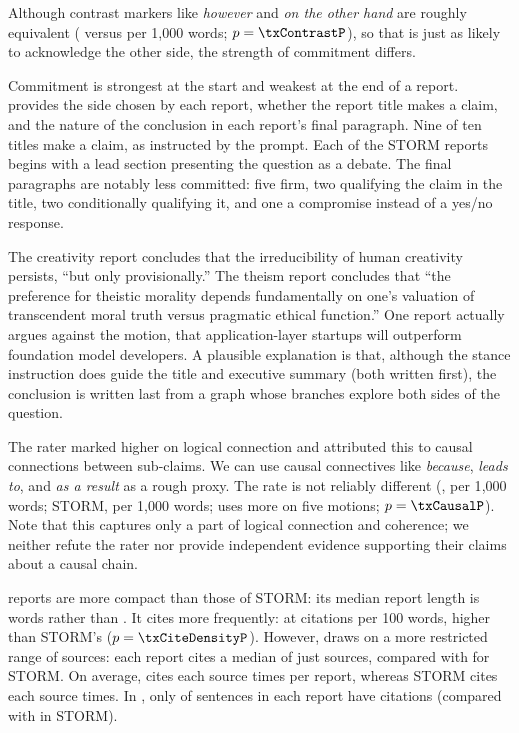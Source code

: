 Although contrast markers like \emph{however} and \emph{on the other hand} are roughly equivalent (\txContrastDc{} versus \txContrastSt{} per 1{,}000 words; $p = \txContrastP$), so that \sys{} is just as likely to acknowledge the other side, the strength of commitment differs.

Commitment is strongest at the start and weakest at the end of a report.  provides the side chosen by each \sys{} report, whether the report title makes a claim, and the nature of the conclusion in each report's final paragraph. Nine of ten titles make a claim, as instructed by the prompt. Each of the STORM reports begins with a lead section presenting the question as a debate. The final paragraphs are notably less committed: five firm, two qualifying the claim in the title, two conditionally qualifying it, and one a compromise instead of a yes/no response.

The creativity report concludes that the irreducibility of human creativity persists, ``but only provisionally.'' The theism report concludes that ``the preference for theistic morality depends fundamentally on one's valuation of transcendent moral truth versus pragmatic ethical function.'' One report actually argues against the motion, that application-layer startups will outperform foundation model developers. A plausible explanation is that, although the stance instruction does guide the title and executive summary (both written first), the conclusion is written last from a graph whose branches explore both sides of the question.

The rater marked \sys{} higher on logical connection and attributed this to causal connections between sub-claims. We can use causal connectives like \emph{because}, \emph{leads to}, and \emph{as a result} as a rough proxy. The rate is not reliably different (\sys{}, \txCausalDc{} per 1{,}000 words; STORM, \txCausalSt{} per 1{,}000 words; \sys{} uses more on five motions; $p = \txCausalP$). Note that this captures only a part of logical connection and coherence; we neither refute the rater nor provide independent evidence supporting their claims about a causal chain.

\sys{} reports are more compact than those of STORM: its median report length is \txWordsDc{} words rather than \txWordsSt. It cites more frequently: at \txCiteDensityDc{} citations per 100 words, higher than STORM's \txCiteDensitySt{} ($p = \txCiteDensityP$). However, \sys{} draws on a more restricted range of sources: each \sys{} report cites a median of just \txSourcesDc{} sources, compared with \txSourcesSt{} for STORM. On average, \sys{} cites each source \txCitesPerSourceDc{} times per report, whereas STORM cites each source \txCitesPerSourceSt{} times. In \sys{}, only \txCitedShareDc{} of sentences in each report have citations (compared with \txCitedShareSt{} in STORM).

